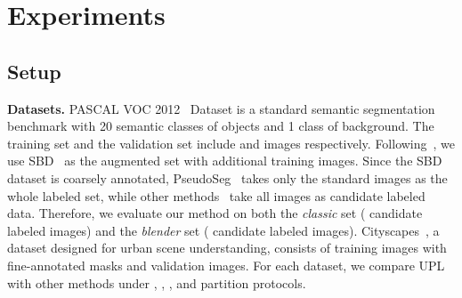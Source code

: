 \documentclass[10pt, twocolumn, letterpaper]{article}
\begin{document}
\section{Experiments}\label{sec:exp}


\subsection{Setup}
\noindent\textbf{Datasets.} 
PASCAL VOC 2012~\cite{voc} Dataset is a standard semantic segmentation benchmark with 20 semantic classes of objects and 1 class of background.
The training set and the validation set include  and  images respectively.
Following~\cite{ael, st++, cps}, we use SBD~\cite{sbd} as the augmented set with  additional training images.
Since the SBD~\cite{sbd} dataset is coarsely annotated, PseudoSeg~\cite{pseudoseg} takes only the standard  images as the whole labeled set, while other methods~\cite{cps, ael} take all  images as candidate labeled data.
Therefore, we evaluate our method on both the \textit{classic} set ( candidate labeled images) and the \textit{blender} set ( candidate labeled images).
Cityscapes~\cite{cityscapes}, a dataset designed for urban scene understanding, consists of  training images with fine-annotated masks and  validation images.
For each dataset, we compare UPL with other methods under , , , and  partition protocols.
\end{document}
